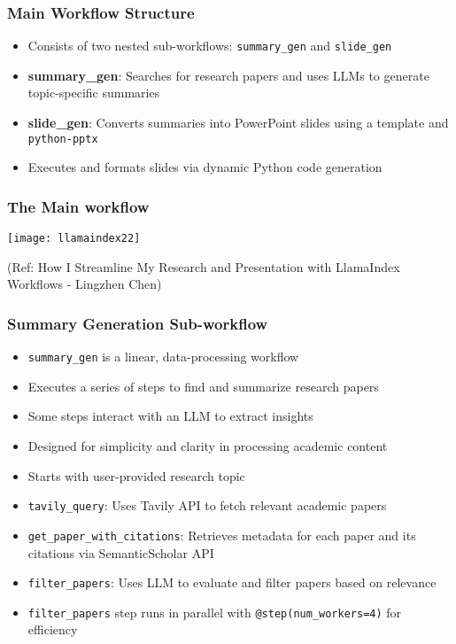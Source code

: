 \begin{frame}[fragile]\frametitle{Main Workflow Structure}
  \begin{itemize}
    \item Consists of two nested sub-workflows: \texttt{summary\_gen} and \texttt{slide\_gen}
    \item \textbf{summary\_gen}: Searches for research papers and uses LLMs to generate topic-specific summaries
    \item \textbf{slide\_gen}: Converts summaries into PowerPoint slides using a template and \texttt{python-pptx}
    \item Executes and formats slides via dynamic Python code generation
  \end{itemize}
\end{frame}


\begin{frame}[fragile]\frametitle{The Main workflow}

\begin{center}
\texttt{[image: llamaindex22]}

{\tiny (Ref: How I Streamline My Research and Presentation with LlamaIndex Workflows - Lingzhen Chen)}
\end{center}
\end{frame}

\begin{frame}[fragile]\frametitle{Summary Generation Sub-workflow}
  \begin{itemize}
    \item \texttt{summary\_gen} is a linear, data-processing workflow
    \item Executes a series of steps to find and summarize research papers
    \item Some steps interact with an LLM to extract insights
    \item Designed for simplicity and clarity in processing academic content
    \item Starts with user-provided research topic
    \item \texttt{tavily\_query}: Uses Tavily API to fetch relevant academic papers
    \item \texttt{get\_paper\_with\_citations}: Retrieves metadata for each paper and its citations via SemanticScholar API
    \item \texttt{filter\_papers}: Uses LLM to evaluate and filter papers based on relevance
    \item \texttt{filter\_papers} step runs in parallel with \texttt{@step(num\_workers=4)} for efficiency	
  \end{itemize}
\end{frame}


